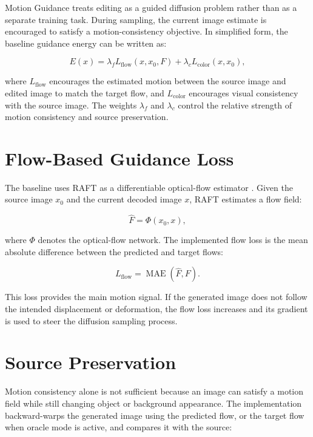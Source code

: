 Motion Guidance treats editing as a guided diffusion problem rather than as a separate training task. During sampling, the current image estimate is encouraged to satisfy a motion-consistency objective. In simplified form, the baseline guidance energy can be written as:

\begin{equation}
E(x) = \lambda_f L_{\mathrm{flow}}(x, x_0, F) + \lambda_c L_{\mathrm{color}}(x, x_0),
\end{equation}

where $L_{\mathrm{flow}}$ encourages the estimated motion between the source image and edited image to match the target flow, and $L_{\mathrm{color}}$ encourages visual consistency with the source image. The weights $\lambda_f$ and $\lambda_c$ control the relative strength of motion consistency and source preservation.

\section{Flow-Based Guidance Loss}

The baseline uses RAFT as a differentiable optical-flow estimator \cite{teed2020raft}. Given the source image $x_0$ and the current decoded image $x$, RAFT estimates a flow field:

\begin{equation}
\hat{F} = \Phi(x_0, x),
\end{equation}

where $\Phi$ denotes the optical-flow network. The implemented flow loss is the mean absolute difference between the predicted and target flows:

\begin{equation}
L_{\mathrm{flow}} = \operatorname{MAE}(\hat{F},F).
\end{equation}

This loss provides the main motion signal. If the generated image does not follow the intended displacement or deformation, the flow loss increases and its gradient is used to steer the diffusion sampling process.

\section{Source Preservation}

Motion consistency alone is not sufficient because an image can satisfy a motion field while still changing object or background appearance. The implementation backward-warps the generated image using the predicted flow, or the target flow when oracle mode is active, and compares it with the source:

